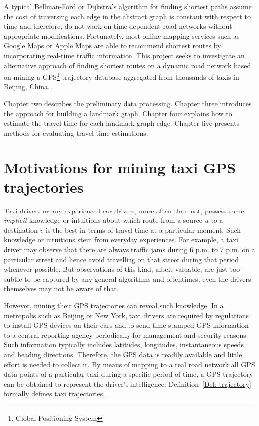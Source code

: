 A typical Bellman-Ford\cite{CLRS09} or Dijkstra's algorithm\cite{Dij59} for finding shortest paths assume the cost of traversing each edge in the abstract graph is constant with respect to time and therefore, do not work on time-de\-pendent road networks without appropriate modifications. Fortunately, most online mapping services such as Google Maps or Apple Maps are able to recommend shortest routes by incorporating real-time traffic information. This project seeks to investigate an alternative approach of finding shortest routes on a dynamic road network based on mining a GPS\footnote{Global Positioning System} trajectory database aggregated from thousands of taxis in Beijing, China.

Chapter two describes the preliminary data processing. Chapter three introduces the approach for building a landmark graph. Chapter four explains how to estimate the travel time for each landmark graph edge. Chapter five presents methods for evaluating travel time estimations. 

\section{Motivations for mining taxi GPS trajectories}
Taxi drivers or any experienced car drivers, more often than not, possess some \emph{implicit} knowledge or intuitions about which route from a source $u$ to a destination $v$ is the best in terms of travel time at a particular moment. Such knowledge or intuitions stem from everyday experiences. For example, a taxi driver may observe that there are always traffic jams during 6 p.m. to 7 p.m. on a particular street and hence avoid travelling on that street during that period whenever possible. But observations of this kind, albeit valuable, are just too subtle to be captured by any general algorithms and oftentimes, even the drivers themselves may not be aware of that.

However, mining their GPS trajectories can reveal such knowledge. In a metropolis such as Beijing or New York, taxi drivers are required by regulations to install GPS devices on their cars and to send time-stamped GPS information to a central reporting agency periodically for management and security reasons. Such information typically includes latitudes, longitudes, instantaneous speeds and heading directions. Therefore, the GPS data is readily available and little effort is needed to collect it. By means of mapping to a real road network all GPS data points of a particular taxi during a specific period of time, a GPS trajectory can be obtained to represent the driver's intelligence. Definition~\ref{Def: trajectory} formally defines taxi trajectories. 

